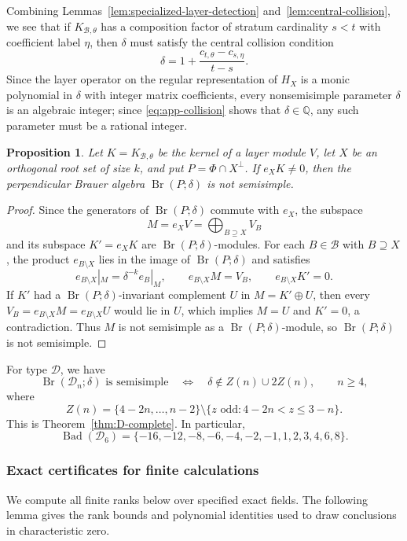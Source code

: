 \documentclass[11pt,a4paper]{amsart}
\newcommand{\Br}{\operatorname{Br}}\newcommand{\Irr}{\operatorname{Irr}}
\newtheorem{proposition}[theorem]{Proposition}
\theoremstyle{uprightdefinition}
\theoremstyle{remark}\newtheorem{remark}[theorem]{Remark}
\begin{document}
Combining Lemmas~\ref{lem:specialized-layer-detection} and~\ref{lem:central-collision}, we see that if $K_{\mathcal B,\theta}$ has a composition factor of stratum cardinality $s<t$ with coefficient label $\eta$, then $\delta$ must satisfy the central collision condition
\begin{equation}\label{eq:app-collision}
 \delta=1+\frac{c_{t,\theta}-c_{s,\eta}}{t-s}.
\end{equation}
Since the layer operator on the regular representation of $H_X$ is a monic polynomial in $\delta$ with integer matrix coefficients, every nonsemisimple parameter $\delta$ is an
algebraic integer; since \eqref{eq:app-collision} shows that $\delta\in\mathbb Q$, any such parameter must be a rational
integer.

\begin{proposition}\label{prop:app-contraction}
Let $K=K_{\mathcal B,\theta}$ be the kernel of a layer module $V$, let $X$ be an orthogonal root set of size $k$,
and put $P=\Phi\cap X^\perp$. If $e_XK\ne0$, then the perpendicular Brauer algebra $\Br(P;\delta)$ is
not semisimple.
\end{proposition}
\begin{proof}
Since the generators of $\Br(P;\delta)$ commute with $e_X$, the subspace
\[
 M=e_XV=\bigoplus_{B\supseteq X}V_B
\]
and its subspace $K'=e_XK$ are $\Br(P;\delta)$-modules.
For each $B\in\mathcal B$ with $B\supseteq X$, the product $e_{B\setminus X}$ lies in the
image of $\Br(P;\delta)$ and satisfies
\[
 e_{B\setminus X}|_M=\delta^{-k}e_B|_M,
 \qquad e_{B\setminus X}M=V_B,
 \qquad e_{B\setminus X}K'=0.
\]
If $K'$ had a $\Br(P;\delta)$-invariant complement $U$ in $M=K'\oplus U$,
then every $V_B=e_{B\setminus X}M=e_{B\setminus X}U$ would lie in $U$, which implies $M=U$ and $K'=0$, a contradiction.
Thus $M$ is not semisimple as a $\Br(P;\delta)$-module, so $\Br(P;\delta)$ is not semisimple.
\end{proof}

For type $\mathscr{D}$, we have
\begin{equation}\label{eq:app-D-input}
 \Br(\mathscr{D}_n;\delta)\text{ is semisimple}
 \quad\Longleftrightarrow\quad
 \delta\notin Z(n)\cup2Z(n),\qquad n\ge4,
\end{equation}
where
\[
 Z(n)=\{4-2n,\ldots,n-2\}
 \setminus\{z\text{ odd}:4-2n<z\le3-n\}.
\]
This is Theorem~\ref{thm:D-complete}.
In particular,
\[
 \operatorname{Bad}(\mathscr{D}_6)=
 \{-16,-12,-8,-6,-4,-2,-1,1,2,3,4,6,8\}.
\]

\subsubsection{Exact certificates for finite calculations}
\label{subsec:exact-certificate-principles}
We compute all finite ranks below over specified exact fields. The following
lemma gives the rank bounds and polynomial identities used to draw
conclusions in characteristic zero.
\end{document}
